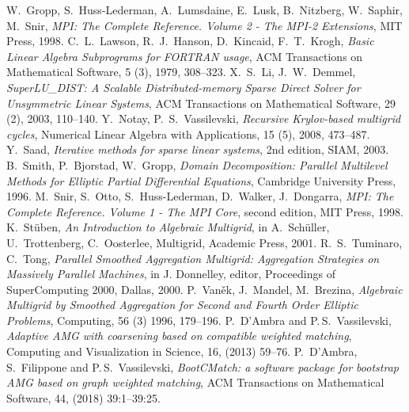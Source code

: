 \begin{thebibliography}{99}
%
W.~Gropp, S.~Huss-Lederman, A.~Lumsdaine, E.~Lusk, B.~Nitzberg, W.~Saphir, M.~Snir,
{\em MPI: The Complete Reference. Volume 2 - The MPI-2 Extensions},
MIT Press, 1998.
%
C.~L.~Lawson, R.~J.~Hanson, D.~Kincaid, F.~T.~Krogh,
\emph{Basic Linear Algebra Subprograms for FORTRAN usage},
ACM Transactions on Mathematical Software, 5 (3), 1979, 308--323.
%
X.~S.~Li, J.~W.~Demmel,
{\em SuperLU\_DIST: A Scalable Distributed-memory
Sparse Direct Solver for Unsymmetric Linear Systems},
ACM Transactions on Mathematical Software, 29 (2), 2003, 110--140.
%
Y.~Notay, P.~S.~Vassilevski,
{\em Recursive Krylov-based multigrid cycles},
Numerical Linear Algebra with Applications, 15 (5), 2008, 473--487.
%
Y.~Saad,
{\em Iterative methods for sparse linear systems}, 2nd edition, SIAM, 2003.
%
B.~Smith, P.~Bjorstad, W.~Gropp,
{\em Domain Decomposition: Parallel Multilevel Methods for Elliptic
Partial Differential Equations},
Cambridge University Press, 1996.
%
M.~Snir, S.~Otto, S.~Huss-Lederman, D.~Walker, J.~Dongarra,
{\em MPI: The Complete Reference. Volume 1 - The MPI Core}, second edition,
MIT Press, 1998.
%
K.~St\"{u}ben,
{\em An Introduction to Algebraic Multigrid},
in A.~Sch\"{u}ller, U.~Trottenberg, C.~Oosterlee, Multigrid,
Academic Press, 2001.
%
R.~S.~Tuminaro, C.~Tong,
{\em Parallel Smoothed Aggregation Multigrid: Aggregation Strategies on Massively Parallel Machines}, in J. Donnelley, editor, Proceedings of SuperComputing 2000, Dallas, 2000.
%
P.~Van\v{e}k, J.~Mandel, M.~Brezina,
{\em Algebraic Multigrid by Smoothed Aggregation for Second and Fourth Order Elliptic Problems},
Computing, 56 (3) 1996, 179--196.
%
P.~D'Ambra and P.\,S.~Vassilevski,
{\em Adaptive AMG with coarsening based on compatible weighted matching},
Computing and Visualization in Science, 16, (2013) 59--76.
%
P.~D'Ambra, S.~Filippone and P.\,S.~Vassilevski,
{\em BootCMatch: a software package for bootstrap AMG based on graph weighted matching},
ACM Transactions on Mathematical Software, 44, (2018) 39:1--39:25.
%
\end{thebibliography}
